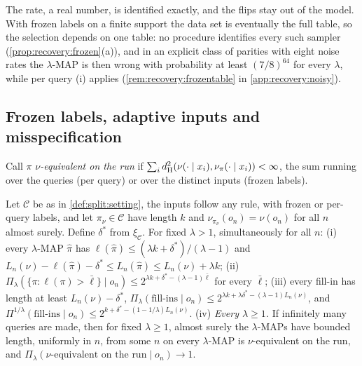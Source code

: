 The rate, a real number, is identified exactly, and the flips stay out of the model. With frozen labels on a finite support the data set is eventually the full table, so the selection depends on one table: no procedure identifies every such sampler (\cref{prop:recovery:frozen}(a)), and in an explicit class of parities with eight noise rates the $\lambda$-MAP is then wrong with probability at least $(7/8)^{64}$ for every $\lambda$, while per query (i) applies (\cref{rem:recovery:frozentable} in \cref{app:recovery:noisy}).

\subsection{Frozen labels, adaptive inputs and misspecification}\label{sec:split:private}

Call $\pi$ \emph{$\nu$-equivalent on the run} if $\sum_id_{\mathrm{H}}^{2}(\nu(\cdot\mid x_i),\nu_\pi(\cdot\mid x_i))<\infty$, the sum running over the queries (per query) or over the distinct inputs (frozen labels).

\begin{theorem}\label{thm:split:private}
Let $\mathcal C$ be as in \cref{def:split:setting}, the inputs follow any rule, with frozen or per-query labels, and let $\pi_\nu\in\mathcal C$ have length $k$ and $\nu_{\pi_\nu}(o_n)=\nu(o_n)$ for all $n$ almost surely. Define $\delta^*$ from $\xi_{\mathcal C}$. For fixed $\lambda>1$, simultaneously for all $n$:
(i) every $\lambda$-MAP $\hat\pi$ has $\ell(\hat\pi)\le(\lambda k+\delta^*)/(\lambda-1)$ and $L_n(\nu)-\ell(\hat\pi)-\delta^*\le L_n(\hat\pi)\le L_n(\nu)+\lambda k$;
(ii) $\Pi_\lambda(\{\pi:\ell(\pi)>\bar\ell\}\mid o_n)\le2^{\lambda k+\delta^*-(\lambda-1)\bar\ell}$ for every $\bar\ell$;
(iii) every fill-in has length at least $L_n(\nu)-\delta^*$, $\Pi_\lambda(\text{fill-ins}\mid o_n)\le2^{\lambda k+\lambda\delta^*-(\lambda-1)L_n(\nu)}$, and $\Pi^{1/\lambda}(\text{fill-ins}\mid o_n)\le2^{k+\delta^*-(1-1/\lambda)L_n(\nu)}$.
(iv) \emph{Every $\lambda\ge1$.} If infinitely many queries are made, then for fixed $\lambda\ge1$, almost surely the $\lambda$-MAPs have bounded length, uniformly in $n$, from some $n$ on every $\lambda$-MAP is $\nu$-equivalent on the run, and $\Pi_\lambda(\nu\text{-equivalent on the run}\mid o_n)\to1$.
\end{theorem}

